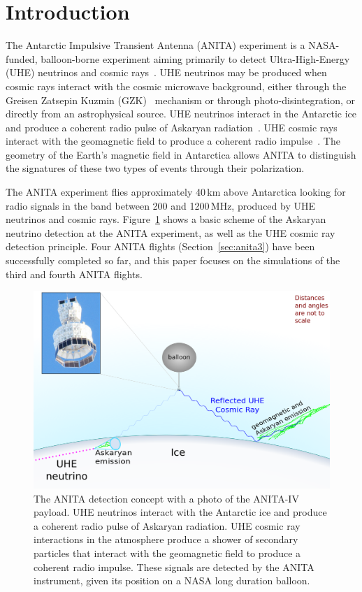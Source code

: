 \section{Introduction}
The Antarctic Impulsive Transient Antenna (ANITA) experiment is a NASA-funded, balloon-borne experiment aiming primarily to detect Ultra-High-Energy (UHE) neutrinos and cosmic rays~\cite{ANITA1detector,ANITA1paper,ANITA2paper,ANITA2erratum}.
UHE neutrinos may be produced when cosmic rays interact with the
cosmic microwave background, either through the Greisen Zatsepin
Kuzmin (GZK)~\cite{greisen1966end,zatsepin1966gt} mechanism or through photo-disintegration, or directly from an astrophysical source.
UHE neutrinos interact in the Antarctic ice and produce a coherent radio pulse of Askaryan radiation~\cite{askaryan}. UHE cosmic rays interact with the geomagnetic field to produce a coherent radio impulse~\cite{suprun2003synchrotron,falcke2003detecting,ANITA1UHECR}. The geometry of the Earth's magnetic field in Antarctica allows ANITA to distinguish the signatures of these two types of events through their polarization.

The ANITA experiment flies approximately 40\,km above Antarctica looking for radio signals in the band between 200 and 1200\,MHz, produced by UHE neutrinos and cosmic rays.
Figure~\ref{fig:intro_ANITAconcept} shows a basic scheme of the
Askaryan neutrino detection at the ANITA experiment, as well as the UHE cosmic ray detection principle.
Four ANITA flights (Section~\ref{sec:anita3}) have been successfully completed so far, and this paper focuses on the simulations of the third and fourth ANITA flights.

\begin{figure}[!h]\centering
  \includegraphics[width=.8\linewidth]{./Figs/ANITA_scheme_icemcpaper.png}
  \caption{The ANITA detection concept with a photo of the ANITA-IV payload. UHE neutrinos interact with the Antarctic ice and produce a coherent radio pulse of Askaryan radiation. UHE cosmic ray interactions in the atmosphere produce a shower of secondary particles that interact with the geomagnetic field to produce a coherent radio impulse. These signals are detected by the ANITA instrument, given its position on a NASA long duration balloon. %
  }
  \label{fig:intro_ANITAconcept}
\end{figure}



